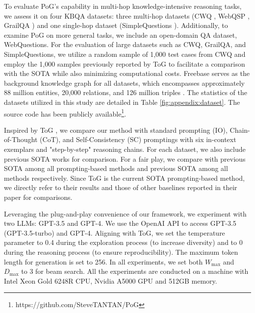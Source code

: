  To evaluate PoG's capability in multi-hop knowledge-intensive reasoning tasks, we assess it on four KBQA datasets: three multi-hop datasets (CWQ \cite{talmor-berant-2018-web}, WebQSP \cite{yih-etal-2016-value}, GrailQA \cite{grailqa}) and one single-hop dataset (SimpleQuestions \cite{simplequestions}). Additionally, to examine PoG on more general tasks, we include an open-domain QA dataset, WebQuestions.
For the evaluation of large datasets such as CWQ, GrailQA, and SimpleQuestions, we utilize a random sample of 1,000 test cases from CWQ and employ the 1,000 samples previously reported by ToG \cite{tog1.0sun2023think} to facilitate a comparison with the SOTA while also minimizing computational costs. Freebase serves as the background knowledge graph for all datasets, which encompasses approximately 88 million entities, 20,000 relations, and 126 million triples \cite{rogluo2023reasoning, freebase}. The statistics of the datasets utilized in this study are detailed in Table \ref{fig:appendix:dataset}. The source code has been publicly available\footnote{https://github.com/SteveTANTAN/PoG}.


Inspired by ToG \cite{tog1.0sun2023think}, we compare our method with standard prompting (IO), Chain-of-Thought (CoT), and Self-Consistency (SC) promptings with six in-context exemplars and "step-by-step" reasoning chains. For each dataset, we also include previous SOTA works for comparison. 
For a fair play, we compare with previous SOTA among all prompting-based methods and previous SOTA among all methods respectively.
Since ToG is the current SOTA prompting-based method, we directly refer to their results and those of other baselines reported in their paper for comparisons.


Leveraging the plug-and-play convenience of our framework, we experiment with two LLMs: GPT-3.5 and GPT-4. We use the OpenAI API to access GPT-3.5 (GPT-3.5-turbo) and GPT-4. Aligning with ToG, we set the temperature parameter to 0.4 during the exploration process (to increase diversity) and to 0 during the reasoning process (to ensure reproducibility). The maximum token length for generation is set to 256.
In all experiments, we set both $W_{\max}$ and $D_{\max}$ to 3 for beam search. All the experiments are conducted on a machine with Intel Xeon
Gold 6248R CPU, Nvidia A5000 GPU and 512GB memory.





